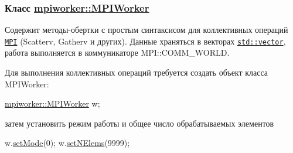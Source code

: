 \subsubsection*{Класс \hyperlink{classmpiworker_1_1MPIWorker}{mpiworker\-::\-M\-P\-I\-Worker}}

Содержит методы-\/обертки с простым синтаксисом для коллективных операций \href{https://www.open-mpi.org/}{\tt M\-P\-I} (Scatterv, Gatherv и других). Данные храняться в векторах \href{http://ru.cppreference.com/w/cpp/container/vector}{\tt std\-::vector}, работа выполняется в коммуникаторе M\-P\-I\-::\-C\-O\-M\-M\-\_\-\-W\-O\-R\-L\-D.

Для выполнения коллективных операций требуется создать объект класса M\-P\-I\-Worker\-: 
\begin{DoxyCode}
\hyperlink{classmpiworker_1_1MPIWorker}{mpiworker::MPIWorker} w;
\end{DoxyCode}
 затем установить режим работы и общее число обрабатываемых элементов 
\begin{DoxyCode}
w.\hyperlink{classmpiworker_1_1MPIWorker_a2ff88f266efae23ec2a12a56bd0472d1}{setMode}(0);
w.\hyperlink{classmpiworker_1_1MPIWorker_afcce321227c6d15a5fc2145cf59cd54d}{setNElems}(9999);
\end{DoxyCode}


